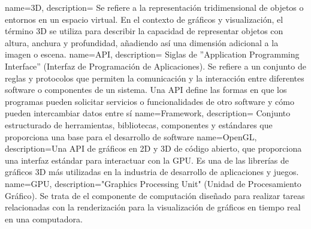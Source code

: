 \documentclass[a4paper, 11pt]{book}
\begin{document}
\printglossaries
{}
{
	name=3D,
	description={
		Se refiere a la representación tridimensional de objetos o entornos en un espacio virtual. En el contexto de gráficos y visualización, el término 3D se utiliza para describir la capacidad de representar objetos con altura, anchura y profundidad, añadiendo así una dimensión adicional a la imagen o escena.
	}
}
{
	name=API,
	description={
		Siglas de ''Application Programming Interface'' (Interfaz de Programación de Aplicaciones). Se refiere a un conjunto de reglas y protocolos que permiten la comunicación y la interacción entre diferentes software o componentes de un sistema. Una API define las formas en que los programas pueden solicitar servicios o funcionalidades de otro software y cómo pueden intercambiar datos entre sí
	}
}
{
	name=Framework,
	description={
		Conjunto estructurado de herramientas, bibliotecas, componentes y estándares que proporciona una base para el desarrollo de software
	}
}
{
	name=OpenGL,
	description={Una API de gráficos en 2D y 3D de código abierto, que proporciona una interfaz estándar para interactuar con la GPU. Es una de las librerías de gráficos 3D más utilizadas en la industria de desarrollo de aplicaciones y juegos.}
}
{
	name=GPU,
	description={"Graphics Processing Unit" (Unidad de Procesamiento Gráfico). Se trata de el componente de computación diseñado para realizar tareas relacionadas con la renderización para la visualización de gráficos en tiempo real en una computadora.}
}
\end{document}
